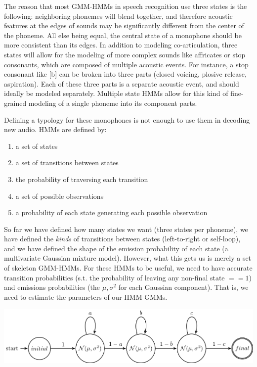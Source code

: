 \documentclass[10pt,a4paper]{article}
\begin{document}
The reason that most GMM-HMMs in speech recognition use three states is the following: neighboring phonemes will blend together, and therefore acoustic features at the edges of sounds may be significantly different from the center of the phoneme. All else being equal, the central state of a monophone should be more consistent than its edges. In addition to modeling co-articulation, three states will allow for the modeling of more complex sounds like affricates or stop consonants, which are composed of multiple acoustic events. For instance, a stop consonant like [b] can be broken into three parts (closed voicing, plosive release, aspiration). Each of these three parts is a separate acoustic event, and should ideally be modeled separately. Multiple state HMMs allow for this kind of fine-grained modeling of a single phoneme into its component parts.

Defining a typology for these monophones is not enough to use them in decoding new audio. HMMs are defined by:

\begin{enumerate}
\item a set of states
\item a set of transitions between states
\item the probability of traversing each transition
\item a set of possible observations
\item a probability of each state generating each possible observation 
\end{enumerate}

So far we have defined how many states we want (three states per phoneme), we have defined the \textit{kinds} of transitions between states (left-to-right or self-loop), and we have defined the shape of the emission probability of each state (a multivariate Gaussian mixture model). However, what this gets us is merely a set of skeleton GMM-HMMs. For these HMMs to be useful, we need to have accurate transition probabilities (s.t. the probability of leaving any non-final state $== 1$) and emissions probabilities (the $\mu, \sigma^2$ for each Gaussian component). That is, we need to estimate the parameters of our HMM-GMMs.

\begin{center}
\includegraphics[width=.9\textwidth,keepaspectratio]{figs/skeleton-hmm.png}
\end{center}
\end{document}
